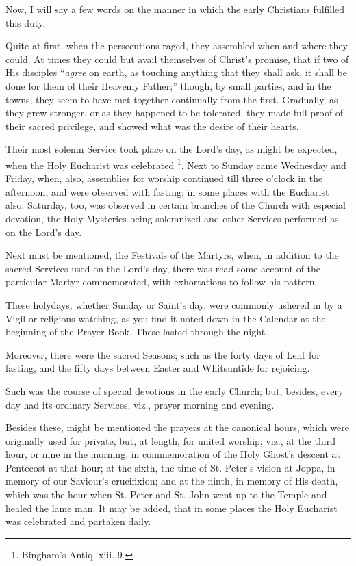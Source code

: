 Now, I will say a few words on the manner in which the early
Christians fulfilled this duty.

Quite at first, when the persecutions raged, they assembled when
and where they could. At times they could but avail themselves of
Christ's promise, that if two of His disciples ``\emph{agree} on
earth, as touching anything that they shall ask, it shall be done for
them of their Heavenly Father;'' though, by small parties, and in
the towns, they seem to have met together continually from the first.
Gradually, as they grew stronger, or as they happened to be tolerated,
they made full proof of their sacred privilege, and showed what was
the desire of their hearts.

Their most solemn Service took place on the Lord's day, as might
be expected, when the Holy Eucharist was celebrated \footnote{Bingham's Antiq. xiii. 9.}. Next to Sunday came Wednesday and Friday, when, also,
assemblies for worship continued till three o'clock in the
afternoon, and were observed with fasting; in some places with the
Eucharist also. Saturday, too, was observed in certain branches of the
Church with especial devotion, the Holy Mysteries being solemnized and
other Services performed as on the Lord's day.

Next must be mentioned, the Festivals of the Martyrs, when, in
addition to the sacred Services used on the Lord's day, there was
read some account of the particular Martyr commemorated, with
exhortations to follow his pattern.

These holydays, whether Sunday or Saint's day, were commonly
ushered in by a Vigil or religious watching, as you find it noted down
in the Calendar at the beginning of the Prayer Book. These lasted
through the night.

Moreover, there were the sacred Seasons; such as the forty days of
Lent for fasting, and the fifty days between Easter and Whitsuntide
for rejoicing.

Such was the course of special devotions in the early Church; but,
besides, every day had its ordinary Services, viz., prayer morning and
evening.

Besides these, might be mentioned the prayers at the canonical
hours, which were originally used for private, but, at length, for
united worship; viz., at the third hour, or nine in the morning, in
commemoration of the Holy Ghost's descent at Pentecost at that hour;
at the sixth, the time of St. Peter's vision at Joppa, in memory of
our Saviour's crucifixion; and at the ninth, in memory of His death,
which was the hour when St. Peter and St. John went up to the Temple
and healed the lame man. It may be added, that in some places the Holy
Eucharist was celebrated and partaken daily.


